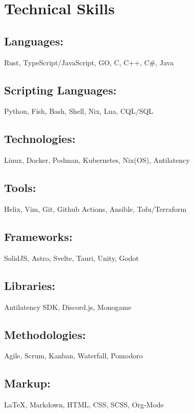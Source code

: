 \section{Technical Skills}

\subsection{Languages:} Rust, TypeScript/JavaScript, GO, C, C++, C\#, Java
\subsection{Scripting Languages:} Python, Fish, Bash, Shell, Nix, Lua, CQL/SQL 
\subsection{Technologies:} Linux, Docker, Podman, Kubernetes, Nix(OS), Antilatency 
\subsection{Tools:} Helix, Vim, Git, Github Actions, Ansible, Tofu/Terraform
\subsection{Frameworks:} SolidJS, Astro, Svelte, Tauri, Unity, Godot
\subsection{Libraries:} Antilatency SDK, Discord.js, Monogame
\subsection{Methodologies:} Agile, Scrum, Kanban, Waterfall, Pomodoro
\subsection{Markup:} {\LaTeX}, Markdown, HTML, CSS, SCSS, Org-Mode
